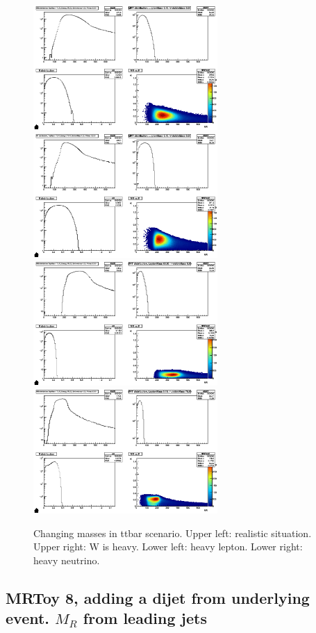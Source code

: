 \documentclass{fheadnote}
\begin{document}
\begin{figure}[htbp]
   \centering
   \includegraphics[width=7cm]{Figures/MRToy6_Realistic}
   \includegraphics[width=7cm]{Figures/MRToy6_HeavyW}\\
   \includegraphics[width=7cm]{Figures/MRToy6_HeavyLepton}
   \includegraphics[width=7cm]{Figures/MRToy6_HeavyNeutrino}
   \caption{Changing masses in ttbar scenario.  Upper left: realistic situation.  Upper right: W is heavy.  Lower left: heavy lepton.  Lower right: heavy neutrino.}
   \label{Figure_MRToy6}
\end{figure}

\subsection{MRToy 8, adding a dijet from underlying event.  $M_R$ from leading jets}
\end{document}
